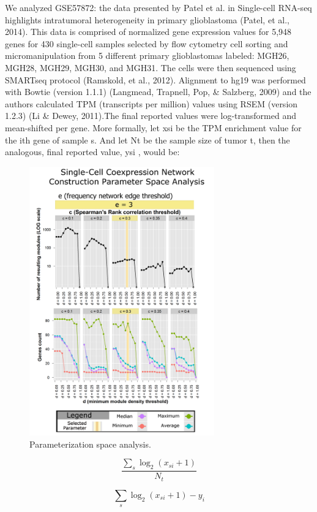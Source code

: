 \documentclass[11pt,twoside,a4paper]{article}
\begin{document}
We analyzed GSE57872: the data presented by Patel et al. in Single-cell RNA-seq highlights intratumoral heterogeneity in primary glioblastoma (Patel, et al., 2014). This data is comprised of normalized gene expression values for 5,948 genes for 430 single-cell samples selected by flow cytometry cell sorting and micromanipulation from 5 different primary glioblastomas labeled: MGH26, MGH28, MGH29, MGH30, and MGH31. The cells were then sequenced using SMARTseq protocol (Ramskold, et al., 2012). Alignment to hg19 was performed with Bowtie (version 1.1.1) (Langmead, Trapnell, Pop, \& Salzberg, 2009) and the authors calculated TPM (transcripts per million) values using RSEM (version 1.2.3) (Li \& Dewey, 2011).The final reported values were log-transformed and mean-shifted per gene. More formally, let xsi be the TPM enrichment value for the ith gene of sample s. And let Nt be the sample size of tumor t, then the analogous, final reported value, ysi , would be: 
\begin{figure}[t]
\centering
\includegraphics[width=80mm]{Figures/ParameterSpaceE=3}
\caption{Parameterization space analysis.}
\label{Parameter Space Figure}
\end{figure}

\begin{equation}\label{equation1}
\frac{\sum_{s} \log_2(x_{si} + 1)} {N_t}
\end{equation}

\begin{equation}\label{equation2}
\sum_{s} \log_2(x_{si} + 1)-y_i
\end{equation}
\end{document}
